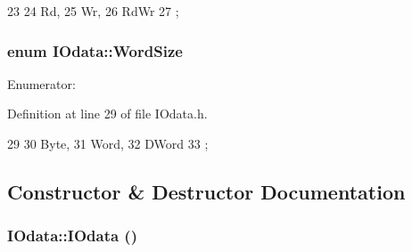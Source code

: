 \begin{DoxyCode}
23             {
24     Rd,
25     Wr,
26     RdWr
27   };
\end{DoxyCode}
\hypertarget{classIOdata_a37c53ebf4bf8d866aac8af572962a84c}{
\subsubsection[{WordSize}]{\setlength{\rightskip}{0pt plus 5cm}enum {\bf IOdata::WordSize}}}
\label{classIOdata_a37c53ebf4bf8d866aac8af572962a84c}
\begin{Desc}
\item[Enumerator: ]\par
\begin{description}
\item[{\em 
\hypertarget{classIOdata_a37c53ebf4bf8d866aac8af572962a84ca00156611f08eeb1b5d361de809dafb8e}{
Byte}
\label{classIOdata_a37c53ebf4bf8d866aac8af572962a84ca00156611f08eeb1b5d361de809dafb8e}
}]\item[{\em 
\hypertarget{classIOdata_a37c53ebf4bf8d866aac8af572962a84ca7d603e9c9a55e3c8dffa4bd8e3dca491}{
Word}
\label{classIOdata_a37c53ebf4bf8d866aac8af572962a84ca7d603e9c9a55e3c8dffa4bd8e3dca491}
}]\item[{\em 
\hypertarget{classIOdata_a37c53ebf4bf8d866aac8af572962a84ca458da82d97e3ea9715c34b558c34f734}{
DWord}
\label{classIOdata_a37c53ebf4bf8d866aac8af572962a84ca458da82d97e3ea9715c34b558c34f734}
}]\end{description}
\end{Desc}



Definition at line 29 of file IOdata.h.


\begin{DoxyCode}
29                {
30     Byte,
31     Word,
32     DWord
33   };
\end{DoxyCode}


\subsection{Constructor \& Destructor Documentation}
\hypertarget{classIOdata_af558c1fc49af58f50c9600423dd5acd7}{
\subsubsection[{IOdata}]{\setlength{\rightskip}{0pt plus 5cm}IOdata::IOdata ()}}
\label{classIOdata_af558c1fc49af58f50c9600423dd5acd7}


